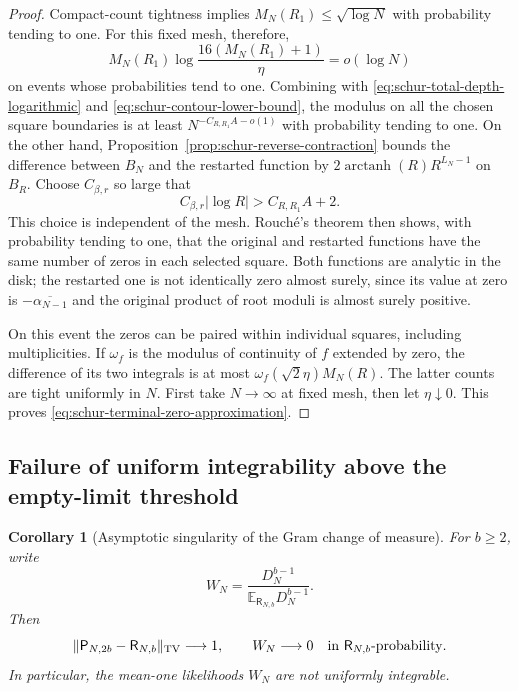 \documentclass[11pt,a4paper]{article}
\numberwithin{equation}{section}
\newtheorem{corollary}[theorem]{Corollary}
\theoremstyle{definition}
\theoremstyle{remark}
\begin{document}
\begin{proof}
Compact-count tightness implies
$M_N(R_1)\le\sqrt{\log N}$ with probability tending to one. For this
fixed mesh, therefore,
\[
 M_N(R_1)\log\frac{16(M_N(R_1)+1)}{\eta}=o(\log N)
\]
on events whose probabilities tend to one. Combining with
\eqref{eq:schur-total-depth-logarithmic} and
\eqref{eq:schur-contour-lower-bound}, the modulus on all the chosen
square boundaries is at least
$N^{-C_{R,R_1}A-o(1)}$ with probability tending to one.
On the other hand, Proposition~\ref{prop:schur-reverse-contraction}
bounds the difference between $B_N$ and the restarted function by
$2\operatorname{arctanh}(R)R^{L_N-1}$ on $B_R$.
Choose $C_{\beta,r}$ so large that
\[
 C_{\beta,r}|\log R|>C_{R,R_1}A+2.
\]
This choice is independent of the mesh. Rouch\'e's theorem then shows,
with probability tending to one, that the original and restarted
functions have the same number of zeros in each selected square.
Both functions are analytic in the disk; the restarted one is not
identically zero almost surely, since its value at zero is
$-\overline{\alpha_{N-1}}$ and the original product of root moduli is
almost surely positive.

On this event the zeros can be paired within individual squares,
including multiplicities. If $\omega_f$ is the modulus of continuity
of $f$ extended by zero, the difference of its two integrals is at
most $\omega_f(\sqrt2\eta)M_N(R)$. The latter counts are tight
uniformly in $N$. First take $N\to\infty$ at fixed mesh, then let
$\eta\downarrow0$. This proves
\eqref{eq:schur-terminal-zero-approximation}.
\end{proof}

\subsection{Failure of uniform integrability above the empty-limit threshold}

\begin{corollary}[Asymptotic singularity of the Gram change of measure]
\label{cor:schur-gram-singularity}
For $b\ge2$, write
\[
 W_N=\frac{D_N^{b-1}}{\mathbb E_{\mathsf R_{N,b}}D_N^{b-1}}.
\]
Then
\begin{equation}
 \|\mathsf P_{N,2b}-\mathsf R_{N,b}\|_{\rm TV}\longrightarrow1,
 \qquad
 W_N\longrightarrow0\quad\hbox{in }\mathsf R_{N,b}\hbox{-probability}.
 \label{eq:schur-gram-singularity}
\end{equation}
In particular, the mean-one likelihoods $W_N$ are not uniformly
integrable.
\end{corollary}
\end{document}
